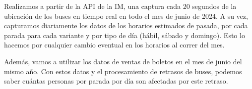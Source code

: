 \documentclass[journal]{IEEEtran}
\begin{document}
Realizamos a partir de la API de la IM, una captura cada 20 segundos de la ubicación de los buses en tiempo real en todo el mes de junio de 2024. A su vez, capturamos diariamente los datos de los horarios estimados de pasada, por cada parada para cada variante y por tipo de día (hábil, sábado y domingo). Esto lo hacemos por cualquier cambio eventual en los horarios al correr del mes.

Además, vamos a utilizar los datos de ventas de boletos en el mes de junio del mismo año. Con estos datos y el procesamiento de retrasos de buses, podemos saber cuántas personas por parada por día son afectadas por este retraso.





%
%

\end{document}
